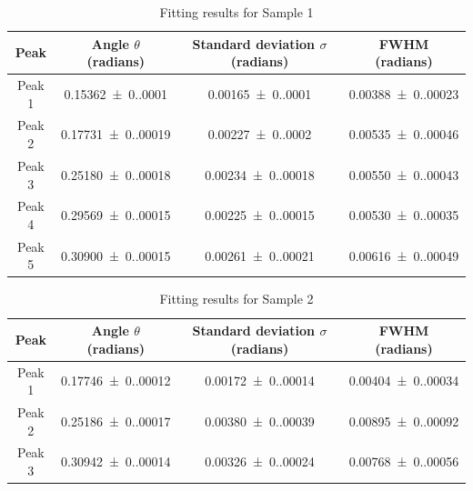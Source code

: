 \begin{table}[H]
    \centering
    \caption{Fitting results for Sample 1}
    \begin{tabular}{|c|c|c|c|}
    \hline
    Peak & Angle $\theta$ (radians) & Standard deviation $\sigma$ (radians) & FWHM (radians) \\
    \hline
    Peak 1 & \SI{0.15362(0.00010)}{} & \SI{0.00165(0.00010)}{} & \SI{0.00388(0.00023)}{} \\
    \hline
    Peak 2 & \SI{0.17731(0.00019)}{} & \SI{0.00227(0.00020)}{} & \SI{0.00535(0.00046)}{} \\
    \hline
    Peak 3 & \SI{0.25180(0.00018)}{} & \SI{0.00234(0.00018)}{} & \SI{0.00550(0.00043)}{} \\
    \hline
    Peak 4 & \SI{0.29569(0.00015)}{} & \SI{0.00225(0.00015)}{} & \SI{0.00530(0.00035)}{} \\
    \hline
    Peak 5 & \SI{0.30900(0.00015)}{} & \SI{0.00261(0.00021)}{} & \SI{0.00616(0.00049)}{} \\
    \hline
    \end{tabular}
\end{table}

\begin{table}[H]
    \centering
    \caption{Fitting results for Sample 2}
    \begin{tabular}{|c|c|c|c|}
    \hline
    Peak & Angle $\theta$ (radians) & Standard deviation $\sigma$ (radians) & FWHM (radians) \\
    \hline
    Peak 1 & \SI{0.17746(0.00012)}{} & \SI{0.00172(0.00014)}{} & \SI{0.00404(0.00034)}{} \\
    \hline
    Peak 2 & \SI{0.25186(0.00017)}{} & \SI{0.00380(0.00039)}{} & \SI{0.00895(0.00092)}{} \\
    \hline
    Peak 3 & \SI{0.30942(0.00014)}{} & \SI{0.00326(0.00024)}{} & \SI{0.00768(0.00056)}{} \\
    \hline
    \end{tabular}
\end{table}
